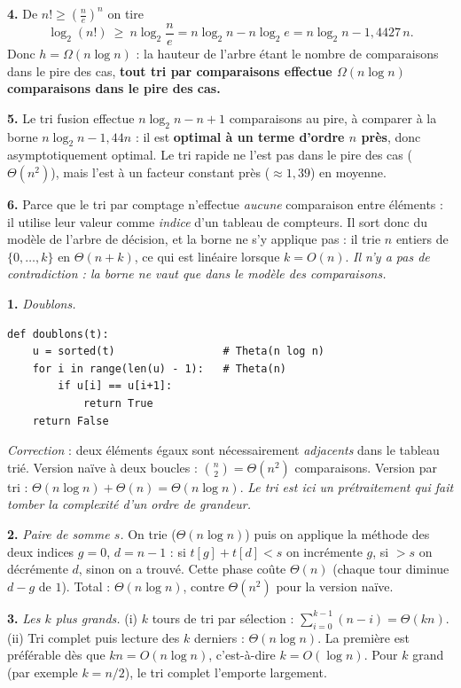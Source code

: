 \documentclass[11pt,a4paper]{article}
\begin{document}
\textbf{4.} De $n!\ge\left(\frac ne\right)^{n}$ on tire
\[
  \log_2(n!)\ \ge\ n\log_2\frac ne = n\log_2 n - n\log_2 e
  = n\log_2 n - 1{,}4427\,n .
\]
Donc $h=\Omega(n\log n)$ : la hauteur de l'arbre étant le nombre de comparaisons dans le
pire des cas, \textbf{tout tri par comparaisons effectue $\Omega(n\log n)$ comparaisons
dans le pire des cas.}

\textbf{5.} Le tri fusion effectue $n\log_2 n - n + 1$ comparaisons au pire, à comparer
à la borne $n\log_2 n - 1{,}44n$ : il est \textbf{optimal à un terme d'ordre $n$ près},
donc asymptotiquement optimal. Le tri rapide ne l'est pas dans le pire des cas
($\Theta(n^2)$), mais l'est à un facteur constant près ($\approx1{,}39$) en moyenne.

\textbf{6.} Parce que le tri par comptage n'effectue \emph{aucune} comparaison entre
éléments : il utilise leur valeur comme \emph{indice} d'un tableau de compteurs. Il
sort donc du modèle de l'arbre de décision, et la borne ne s'y applique pas : il trie
$n$ entiers de $\{0,\dots,k\}$ en $\Theta(n+k)$, ce qui est linéaire lorsque $k=O(n)$.
\emph{Il n'y a pas de contradiction : la borne ne vaut que dans le modèle des
comparaisons.}

\reponse
\textbf{1.} \emph{Doublons.}
\begin{lstlisting}
def doublons(t):
    u = sorted(t)                 # Theta(n log n)
    for i in range(len(u) - 1):   # Theta(n)
        if u[i] == u[i+1]:
            return True
    return False
\end{lstlisting}
\emph{Correction} : deux éléments égaux sont nécessairement \emph{adjacents} dans le
tableau trié. Version naïve à deux boucles : $\binom n2=\Theta(n^2)$ comparaisons.
Version par tri : $\Theta(n\log n)+\Theta(n)=\Theta(n\log n)$. \emph{Le tri est ici un
prétraitement qui fait tomber la complexité d'un ordre de grandeur.}

\textbf{2.} \emph{Paire de somme $s$.} On trie ($\Theta(n\log n)$) puis on applique la
méthode des deux indices $g=0$, $d=n-1$ : si $t[g]+t[d]<s$ on incrémente $g$, si
$>s$ on décrémente $d$, sinon on a trouvé. Cette phase coûte $\Theta(n)$ (chaque tour
diminue $d-g$ de $1$). Total : $\Theta(n\log n)$, contre $\Theta(n^2)$ pour la version
naïve.

\textbf{3.} \emph{Les $k$ plus grands.}
(i) $k$ tours de tri par sélection : $\sum_{i=0}^{k-1}(n-i)=\Theta(kn)$.
(ii) Tri complet puis lecture des $k$ derniers : $\Theta(n\log n)$.
La première est préférable dès que $kn = O(n\log n)$, c'est-à-dire
$\boxed{k=O(\log n)}$. Pour $k$ grand (par exemple $k=n/2$), le tri complet l'emporte
largement.
\end{document}
